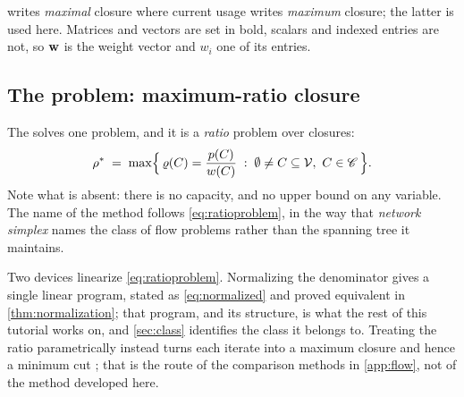 \noindent
\citet{Picard1976} writes \emph{maximal} closure where current usage writes
\emph{maximum} closure; the latter is used here. Matrices and vectors are set in
bold, scalars and indexed entries are not, so $\mathbf{w}$ is the weight vector
and $w_i$ one of its entries.

\subsection{The problem: maximum-ratio closure}\label{sec:problem}
The \FS{} solves one problem, and it is a \emph{ratio} problem over closures:
\begin{equation}\label{eq:ratioproblem}
  \rho^* \;=\; \max\Bigl\{\,\varrho(C)=\frac{p(C)}{w(C)}
              \;:\; \emptyset\ne C\subseteq\mathcal V,\ C\in\mathscr C \,\Bigr\}.
\end{equation}
Note what is absent: there is no capacity, and no upper bound on any variable.
The name of the method follows \eqref{eq:ratioproblem}, in the way that
\emph{network simplex} names the class of flow problems rather than the spanning
tree it maintains.

Two devices linearize \eqref{eq:ratioproblem}. Normalizing the denominator
\citep{CharnesCooper1962} gives a single linear program, stated as
\eqref{eq:normalized} and proved equivalent in \cref{thm:normalization}; that
program, and its structure, is what the rest of this tutorial works on, and
\cref{sec:class} identifies the class it belongs to. Treating the ratio
parametrically instead \citep{Dinkelbach1967} turns each iterate into a maximum
closure and hence a minimum cut \citep{Picard1976}; that is the route of the
comparison methods in \cref{app:flow}, not of the method developed here.

